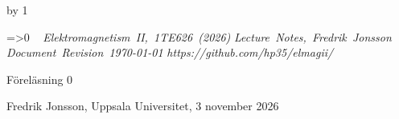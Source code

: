 %
%
%
%
%
%
%
\def\coursename{Elektromagnetism II}
\def\coursecode{1TE626}
\def\courseyear{2026}
\def\courserepo{https://github.com/hp35/elmagii/}
\def\lecturenumber{0}
\def\lecturetitle{Grundl{\"a}ggande vektoranalys inom f{\"a}ltteori}
\def\lecturesubtitle{}
\def\lectureauthor{Fredrik Jonsson}
\def\lectureplace{Uppsala Universitet}
\def\lecturedate{3 november 2026}
\edef\expandedlecturenumber{0}
\def\ifempty#1{\ifx\relax#1\relax}
\advance\chapno by 1
\immediate{}
\hsize=150mm\hoffset=4.6mm\vsize=230mm\voffset=7mm
\topskip=0pt\baselineskip=12pt\parskip=0pt\leftskip=0pt\parindent=15pt
\ifcolors
  \voffset=-10.2mm\topskip=0pt
\fi
\headline={\ifnum\secno>0\ifodd\pageno\rightheadline\else\leftheadline\fi
  \else\hfill\fi}
\def\rightheadline{\tenrm{\it F\"orel\"asning 0}
  \hfil{\it \coursename, \coursecode\ (\courseyear)}}
\def\leftheadline{\tenrm{\it \coursename, \coursecode\ (\courseyear)}
  \hfil{\it F\"orel\"asning 0}}
\noindent~\vskip-60pt\hskip-40pt{}
\vskip-42pt\hfill\vbox{
    \hbox{{\it \coursename, \coursecode\ (\courseyear)}}
    \hbox{{\it Lecture Notes, \lectureauthor}}
    \hbox{{\it Document Revision \today}}
    \hbox{{\it \courserepo}}}\vskip 36pt
\centerline{\twelvesc F\"orel\"asning 0}
\vskip 24pt\noindent
\centerline{}
\expandafter\ifempty\expandafter{\lecturesubtitle}%
  \else\centerline{\twelvesc\lecturesubtitle}\fi
\bigskip
\centerline{\lectureauthor, \lectureplace, \lecturedate}
\vskip24pt



